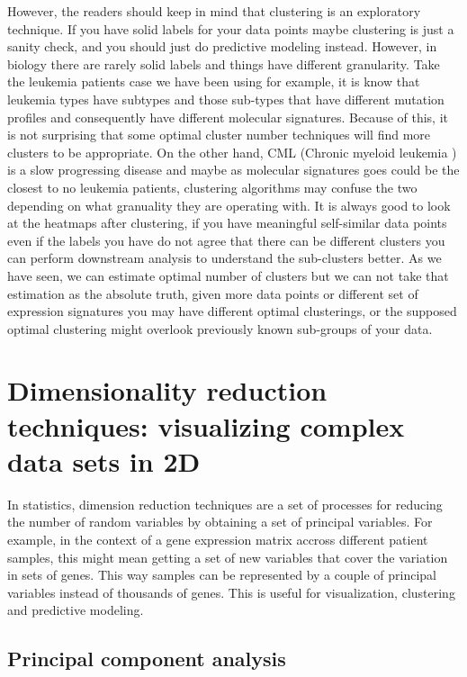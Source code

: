 \documentclass[12pt,]{krantz}
\begin{document}
However, the readers should keep in mind that clustering is an exploratory technique. If you have solid labels for your data points maybe clustering is just a sanity check, and you should just do predictive modeling instead. However, in biology there are rarely solid labels and things have different granularity. Take the leukemia patients case we have been using for example, it is know that leukemia types have subtypes and those sub-types that have different mutation profiles and consequently have different molecular signatures. Because of this, it is not surprising that some optimal cluster number techniques will find more clusters to be appropriate. On the other hand, CML (Chronic myeloid leukemia ) is a slow progressing disease and maybe as molecular signatures goes could be the closest to no leukemia patients, clustering algorithms may confuse the two depending on what granuality they are operating with. It is always good to look at the heatmaps after clustering, if you have meaningful self-similar data points even if the labels you have do not agree that there can be different clusters you can perform downstream analysis to understand the sub-clusters better. As we have seen, we can estimate optimal number of clusters but we can not take that estimation as the absolute truth, given more data points or different set of expression signatures you may have different optimal clusterings, or the supposed optimal clustering might overlook previously known sub-groups of your data.

\hypertarget{dimensionality-reduction-techniques-visualizing-complex-data-sets-in-2d}{%
\section{Dimensionality reduction techniques: visualizing complex data sets in 2D}\label{dimensionality-reduction-techniques-visualizing-complex-data-sets-in-2d}}

In statistics, dimension reduction techniques are a set of processes for reducing the number of random variables by obtaining a set of principal variables. For example, in the context of a gene expression matrix accross different patient samples, this might mean getting a set of new variables that cover the variation in sets of genes. This way samples can be represented by a couple of principal variables instead of thousands of genes. This is useful for visualization, clustering and predictive modeling.

\hypertarget{principal-component-analysis}{%
\subsection{Principal component analysis}\label{principal-component-analysis}}
\end{document}
